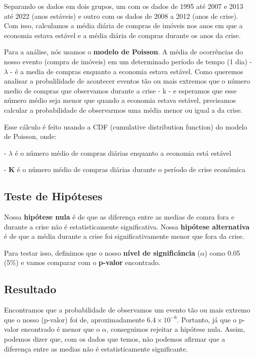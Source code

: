 \documentclass{article}
\begin{document}
    Separando os dados em dois grupos, um com os dados de 1995 até 2007 e 2013 até 2022 (anos estáveis) e outro com os dados de 2008
    a 2012 (anos de crise). Com isso, calculamos a média diária de compras de imóveis nos anos em que a economia estava estável e a 
    média diária de compras durante os anos da crise. 
    
    Para a análise, nós usamos o \textbf{modelo de Poisson}. A média de ocorrências do nosso evento (compra de imóveis) em um determinado
    período de tempo (1 dia) - $\lambda$ - é a media de compras enquanto a economia estava estável. Como queremos analisar a probalilidade
    de acontecer eventos tão ou mais extremos que o número medio de compras que observamos durante a crise - k - e esperamos que esse
    número médio seja menor que quando a economia estava estável, precisamos calcular a probabilidade de observarmos uma média menor ou 
    igual a da crise.

    Esse cálculo é feito usando a CDF (cumulative distribution function) do modelo de Poisson, onde:

    - \textbf{$\lambda$} é o número médio de compras diárias enquanto a economia está estável

    - \textbf{$\mathbf{K}$} é o número médio de compras diárias durante o período de crise econômica\\


    \subsection*{Teste de Hipóteses}

    Nossa \textbf{hipótese nula} é de que as diferença entre as medias de comra fora e durante a crise não é estatisticamente significativa.
    Nossa \textbf{hipótese alternativa} é de que a média durante a crise foi significativamente menor que fora da crise.

    Para testar isso, definimos que o nosso \textbf{nível de significância} ($\alpha$) como 0.05 (5\%) e vamos comparar com o \textbf{p-valor}
    encontrado.\\


    \subsection*{Resultado}
    
    Encontramos que a probabilidade de observamos um evento tão ou mais extremo que o nosso (p-valor) foi de, aproximadamente
     $6.4\times 10^{-6}$. 
    Portanto, já que o p-valor encontrado é menor que o $\alpha$, conseguimos rejeitar a hipótese nula. Assim, podemos dizer
    que, com os dados que temos, não podemos afirmar que a diferença entre as medias não é estatisticamente significante.
    
\end{document}
